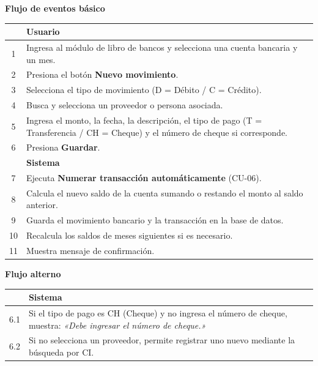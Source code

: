 \documentclass[stu]{apa7}
\begin{document}
\vspace{0.3cm}

\textbf{Flujo de eventos básico}

\begin{tabularx}{\textwidth}{|c|X|}
\hline
& \textbf{Usuario} \\
\hline
1 & Ingresa al módulo de libro de bancos y selecciona una cuenta bancaria y un mes. \\
\hline
2 & Presiona el botón \textbf{Nuevo movimiento}. \\
\hline
3 & Selecciona el tipo de movimiento (D = Débito / C = Crédito). \\
\hline
4 & Busca y selecciona un proveedor o persona asociada. \\
\hline
5 & Ingresa el monto, la fecha, la descripción, el tipo de pago (T = Transferencia / CH = Cheque) y el número de cheque si corresponde. \\
\hline
6 & Presiona \textbf{Guardar}. \\
\hline
& \textbf{Sistema} \\
\hline
7 & Ejecuta \textbf{Numerar transacción automáticamente} (CU-06). \\
\hline
8 & Calcula el nuevo saldo de la cuenta sumando o restando el monto al saldo anterior. \\
\hline
9 & Guarda el movimiento bancario y la transacción en la base de datos. \\
\hline
10 & Recalcula los saldos de meses siguientes si es necesario. \\
\hline
11 & Muestra mensaje de confirmación. \\
\hline
\end{tabularx}

\vspace{0.3cm}

\textbf{Flujo alterno}

\begin{tabularx}{\textwidth}{|c|X|}
\hline
& \textbf{Sistema} \\
\hline
6.1 & Si el tipo de pago es CH (Cheque) y no ingresa el número de cheque, muestra: \textit{«Debe ingresar el número de cheque.»} \\
\hline
6.2 & Si no selecciona un proveedor, permite registrar uno nuevo mediante la búsqueda por CI. \\
\hline
\end{tabularx}

\vspace{0.3cm}
\end{document}
